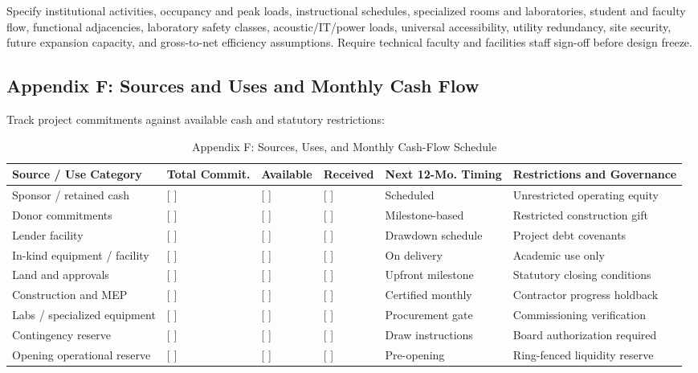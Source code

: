 Specify institutional activities, occupancy and peak loads, instructional schedules, specialized rooms and laboratories, student and faculty flow, functional adjacencies, laboratory safety classes, acoustic/IT/power loads, universal accessibility, utility redundancy, site security, future expansion capacity, and gross-to-net efficiency assumptions. Require technical faculty and facilities staff sign-off before design freeze.

\subsection{Appendix F: Sources and Uses and Monthly Cash Flow}

Track project commitments against available cash and statutory restrictions:

\begin{table}[t]
\centering
\small
\caption{Appendix F: Sources, Uses, and Monthly Cash-Flow Schedule}
\label{tab:app_f_sources_uses}
\begin{tabularx}{\textwidth}{p{3.8cm} p{2.2cm} p{2.0cm} p{2.0cm} p{2.8cm} >{\raggedright\arraybackslash}X}
\toprule
\textbf{Source / Use Category} & \textbf{Total Commit.} & \textbf{Available} & \textbf{Received} & \textbf{Next 12-Mo. Timing} & \textbf{Restrictions and Governance} \\
\midrule
Sponsor / retained cash & {[ ]} & {[ ]} & {[ ]} & Scheduled & Unrestricted operating equity \\
Donor commitments & {[ ]} & {[ ]} & {[ ]} & Milestone-based & Restricted construction gift \\
Lender facility & {[ ]} & {[ ]} & {[ ]} & Drawdown schedule & Project debt covenants \\
In-kind equipment / facility & {[ ]} & {[ ]} & {[ ]} & On delivery & Academic use only \\
\midrule
Land and approvals & {[ ]} & {[ ]} & {[ ]} & Upfront milestone & Statutory closing conditions \\
Construction and MEP & {[ ]} & {[ ]} & {[ ]} & Certified monthly & Contractor progress holdback \\
Labs / specialized equipment & {[ ]} & {[ ]} & {[ ]} & Procurement gate & Commissioning verification \\
Contingency reserve & {[ ]} & {[ ]} & {[ ]} & Draw instructions & Board authorization required \\
Opening operational reserve & {[ ]} & {[ ]} & {[ ]} & Pre-opening & Ring-fenced liquidity reserve \\
\bottomrule
\end{tabularx}
\end{table}

